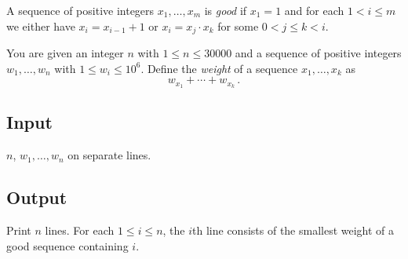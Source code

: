 
A sequence of positive integers $x_1,\ldots,x_m$ is \emph{good} if  $x_1 = 1$ and for each $1 < i \leq m$ we either have $x_i=x_{i-1}+1$ or $x_i=x_j\cdot x_k$ for some $0< j\leq k< i$.


You are given an integer $n$ with $1\leq n\leq 30000$ and a sequence of positive integers $w_1,\ldots,w_n$  with $1\leq w_i \leq 10^6$. 
Define the \emph{weight} of a sequence $x_1,\ldots,x_k$ as \[ w_{x_1} +\cdots +w_{x_k}\,.\] 

\subsection*{Input}

$n$, $w_1, \ldots, w_n$ on separate lines.

\subsection*{Output}

Print $n$ lines.
For each $1\leq i \leq n$, the $i$th line consists of the smallest weight of a good sequence containing $i$.
